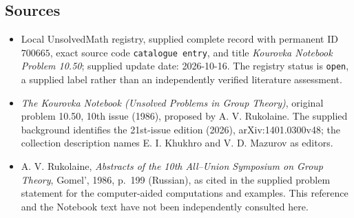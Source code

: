 \documentclass[11pt]{article}
\begin{document}
\subsection{Sources}
\begin{itemize}
\item Local UnsolvedMath registry, supplied complete record with permanent ID \(700665\), exact source code \texttt{catalogue entry}, and title \emph{Kourovka Notebook Problem 10.50}; supplied update date: 2026-10-16. The registry status is \texttt{open}, a supplied label rather than an independently verified literature assessment.
\item \emph{The Kourovka Notebook (Unsolved Problems in Group Theory)}, original problem 10.50, 10th issue (1986), proposed by A. V. Rukolaine. The supplied background identifies the 21st-issue edition (2026), arXiv:1401.0300v48; the collection description names E. I. Khukhro and V. D. Mazurov as editors.
\item A. V. Rukolaine, \emph{Abstracts of the 10th All--Union Symposium on Group Theory}, Gomel', 1986, p.~199 (Russian), as cited in the supplied problem statement for the computer-aided computations and examples. This reference and the Notebook text have not been independently consulted here.
\end{itemize}
\end{document}
